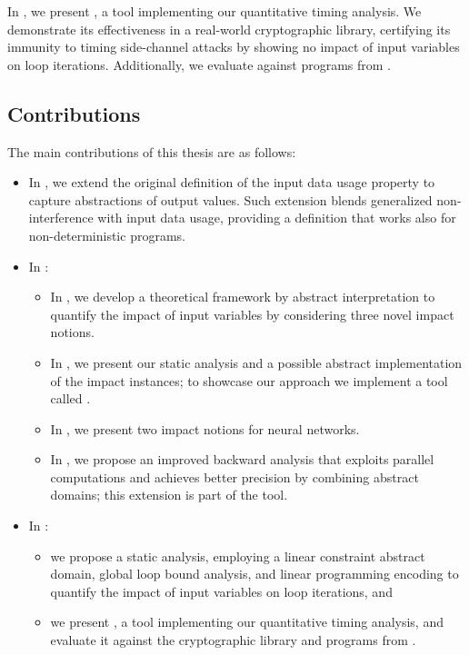 In , we present \timesec, a tool implementing our quantitative timing analysis.
We demonstrate its effectiveness in a real-world cryptographic library, certifying its immunity to timing side-channel attacks by showing no impact of input variables on loop iterations.
Additionally, we evaluate \timesec{} against programs from \svcomp.

\subsection{Contributions}

The main contributions of this thesis are as follows:
\begin{itemize}
  \item In , we extend the original definition of the input data usage property to capture abstractions of output values.
  Such extension blends generalized non-interference with input data usage, providing a definition that works also for non-deterministic programs.
  \item In :
    \begin{itemize}
      \item In , we develop a theoretical framework by abstract interpretation to quantify the impact of input variables by considering three novel impact notions.
      \item In , we present our static analysis and a possible abstract implementation of the impact instances; to showcase our approach we implement a tool called \impatto\sidenote{\impattourl}.
      \item In , we present two impact notions for neural networks.
      \item In , we propose an improved backward analysis that exploits parallel computations and achieves better precision by combining abstract domains; this extension is part of the \libra\sidenote{\libraurl} tool.
    \end{itemize}
  \item In :
    \begin{itemize}
      \item we propose a static analysis, employing a linear constraint abstract domain, global loop bound analysis, and linear programming encoding to quantify the impact of input variables on loop iterations, and
      \item we present \timesec\sidenote{\timesecurl}, a tool implementing our quantitative timing analysis, and evaluate it against the \bignum{} cryptographic library\sidenote{\bignumurl} and programs from \svcomp \sidenote{\svcompurl}.
    \end{itemize}
\end{itemize}
